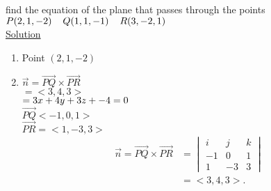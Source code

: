 \begin{example}
 find the equation of the plane that passes through the points
$P(2,1,-2) \hspace{.4cm} Q(1,1,-1)\hspace{.4cm} R(3,-2,1)$ \\
{\color{smalt(darkpowderblue)}\underline{Solution}}
\begin{enumerate}
    \item  Point $(2,1,-2)$
    \item $\overrightarrow{n} = \overrightarrow{PQ} \times \overrightarrow{PR}$\\
$=<3,4,3>$\\
$=3x + 4y  + 3z + -4\\ = 0$\\
$\overrightarrow{PQ} <-1,0,1>$\\
$\overrightarrow{PR} = <1,-3,3>$
\begin{align*}
\overrightarrow{n} = \overrightarrow{PQ} \times \overrightarrow{PR}
&=\begin{vmatrix}
 i & j & k \\
  -1 & 0 & 1 \\
  1 & -3 & 3 
 \end{vmatrix}\\
 & =<3,4,3>.
 \end{align*}
\end{enumerate}
\end{example}
 \noindent{\color{smalt(darkpowderblue)}\rule{\linewidth}{.2mm}}